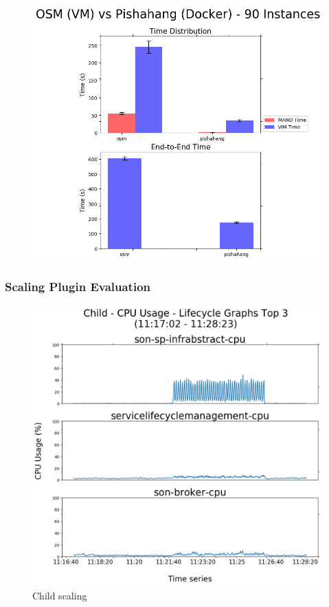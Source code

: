 \begin{figure}[h]
	\centering
	\includegraphics[width=0.7\linewidth]{figures/scalability_graphs/Comparison-VM-Docker/Time_comparison}
	\caption{}
	\label{fig:timecomparison}
\end{figure}


\subsubsection{Scaling Plugin Evaluation}

\begin{figure}[h]
	\centering
	\includegraphics[width=0.7\linewidth]{figures/scalability_graphs/Scalability-Evaluation/Child-TOP-3-Lifecycle}
	\caption{Child scaling}
	\label{fig:child-top-3-lifecycle}
\end{figure}

